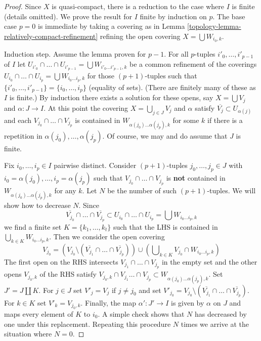 \begin{proof}

Since $X$ is quasi-compact, there is a reduction to the
case where $I$ is finite (details omitted).
We prove the result for $I$ finite by induction on $p$.
The base case $p = 0$ is immediate by taking a covering as in
Lemma \ref{topology-lemma-relatively-compact-refinement}
refining the open covering $X = \bigcup W_{i_0, k}$.

\medskip\noindent
Induction step. Assume the lemma proven for $p - 1$.
For all $p$-tuples $i'_0, \ldots, i'_{p - 1}$ of $I$ let
$U_{i'_0} \cap \ldots \cap U_{i'_{p - 1}} =
\bigcup W_{i'_0 \ldots i'_{p - 1}, k}$
be a common refinement of the coverings
$U_{i_0} \cap \ldots \cap U_{i_p} = \bigcup W_{i_0 \ldots i_p, k}$
for those $(p + 1)$-tuples such that
$\{i'_0, \ldots, i'_{p - 1}\} = \{i_0, \ldots, i_p\}$ (equality of sets).
(There are finitely many of these as $I$ is finite.)
By induction there exists a solution for these opens, say
$X = \bigcup V_j$ and $\alpha : J \to I$.
At this point the covering $X = \bigcup_{j \in J} V_j$
and $\alpha$ satisfy $\overline{V_j} \subset U_{\alpha(j)}$
and each $V_{j_0} \cap \ldots \cap V_{j_p}$
is contained in $W_{\alpha(j_0) \ldots \alpha(j_p), k}$
for some $k$ if there is a repetition in $\alpha(j_0), \ldots, \alpha(j_p)$.
Of course, we may and do assume that $J$ is finite.

\medskip\noindent
Fix $i_0, \ldots, i_p \in I$ pairwise distinct. Consider $(p + 1)$-tuples
$j_0, \ldots, j_p \in J$ with $i_0 = \alpha(j_0), \ldots, i_p = \alpha(j_p)$
such that $V_{j_0} \cap \ldots \cap V_{j_p}$
is {\bf not} contained in $W_{\alpha(j_0) \ldots \alpha(j_p), k}$ for any $k$.
Let $N$ be the number of such $(p + 1)$-tuples. We will show how to decrease
$N$. Since
$$
\overline{V_{j_0}} \cap \ldots \cap \overline{V_{j_p}} \subset
U_{i_0} \cap \ldots \cap U_{i_p} = \bigcup W_{i_0 \ldots i_p, k}
$$
we find a finite set $K = \{k_1, \ldots, k_t\}$ such that the LHS
is contained in $\bigcup_{k \in K} W_{i_0 \ldots i_p, k}$.
Then we consider the open covering
$$
V_{j_0} =
(V_{j_0} \setminus (\overline{V_{j_1}} \cap \ldots \cap \overline{V_{j_p}}))
\cup (\bigcup\nolimits_{k \in K} V_{j_0} \cap W_{i_0 \ldots i_p, k})
$$
The first open on the RHS intersects $V_{j_1} \cap \ldots \cap V_{j_p}$
in the empty set and the other opens $V_{j_0, k}$ of the RHS
satisfy $V_{j_0, k} \cap V_{j_1} \ldots \cap V_{j_p} \subset
W_{\alpha(j_0) \ldots \alpha(j_p), k}$.
Set $J' = J \amalg K$. For $j \in J$ set $V'_j = V_j$ if $j \not = j_0$
and set $V'_{j_0} =
V_{j_0} \setminus (\overline{V_{j_1}} \cap \ldots \cap \overline{V_{j_p}})$.
For $k \in K$ set $V'_k = V_{j_0, k}$. Finally, the map $\alpha' : J' \to I$
is given by $\alpha$ on $J$ and maps every element of $K$ to $i_0$.
A simple check shows that $N$ has decreased by one under this replacement.
Repeating this procedure $N$ times we arrive at the situation where
$N = 0$.


\end{proof}
